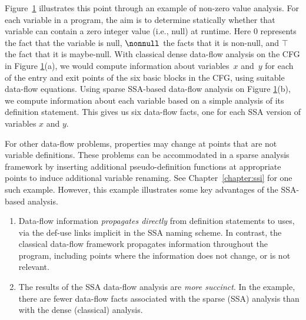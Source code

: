 \begin{figure}[t]%
\label{fig:part1-vanilla-cfgexample} \end{figure}

Figure~\ref{fig:part1-vanilla-cfgexample} illustrates this point through an example of non-zero value analysis. 
For each variable in a program, the aim is to determine statically whether that variable can contain a zero integer value (i.e., null) at runtime. 
Here $0$ represents the fact that the variable is null, $\nonnull$ the facts that it is non-null, and $\top$ the fact that it is maybe-null. 
With classical dense data-flow analysis on the CFG in Figure \ref{fig:part1-vanilla-cfgexample}(a), we would compute information about variables~$x$ and~$y$ for each of the entry and exit points of the six basic blocks in the CFG, using suitable data-flow equations. 
Using sparse SSA-based data-flow analysis on Figure \ref{fig:part1-vanilla-cfgexample}(b), we compute information about each variable based on a simple analysis of its definition statement. 
This gives us six data-flow facts, one for each SSA version of variables $x$ and $y$.

For other data-flow problems, properties may change at points that are not variable definitions. 
These problems can be accommodated in a sparse analysis framework by inserting additional pseudo-definition functions at appropriate points to induce additional variable renaming. 
See Chapter~\ref{chapter:ssi} for one such example.
%
However, this example illustrates some key advantages of the SSA-based analysis.
\begin{enumerate} \item Data-flow information \textit{propagates directly} from definition statements to uses, via the def-use links implicit in the SSA naming scheme. 
In contrast, the classical data-flow framework propagates information throughout the program, including points where the information does not change, or is not relevant.
\item The results of the SSA data-flow analysis are \textit{more succinct}. 
In the example, there are fewer data-flow facts associated with the sparse (SSA) analysis than with the dense (classical) analysis.
\end{enumerate}

